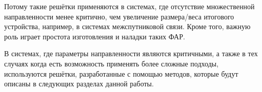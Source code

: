 Потому такие решётки применяются в системах, где отсутствие множественной направленности менее критично, 
чем увеличение размера/веса итогового устройства, например, в системах межспутниковой связи. 
Кроме того, важную роль играет простота изготовления и наладки таких ФАР.

В системах, где параметры направленности являются критичными, а также в тех случаях когда 
есть возможность применять более сложные подходы, используются решётки, разработанные с помощью методов, 
которые будут описаны в следующих разделах данной работы. 

